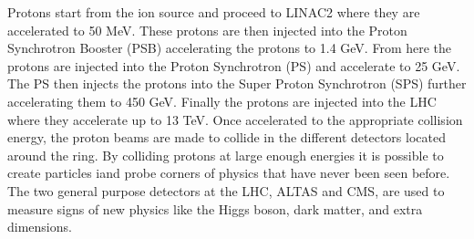 Protons start from the ion source and proceed to LINAC2 where they are accelerated to 50 MeV. These protons are then injected into the Proton Synchrotron Booster (PSB) accelerating the protons to 1.4 GeV. From here the protons are injected into the Proton Synchrotron (PS) and accelerate to 25 GeV. The PS then injects the protons into the Super Proton Synchrotron (SPS) further accelerating them to 450 GeV. Finally the protons are injected into the LHC where they accelerate up to 13 TeV. Once accelerated to the appropriate collision energy, the proton beams are made to collide in the different detectors located around the ring. By colliding protons at large enough energies it is possible to create particles iand probe corners of physics that have never been seen before. The two general purpose detectors at the LHC, ALTAS and CMS, are used to measure signs of new physics like the Higgs boson, dark matter, and extra dimensions.


